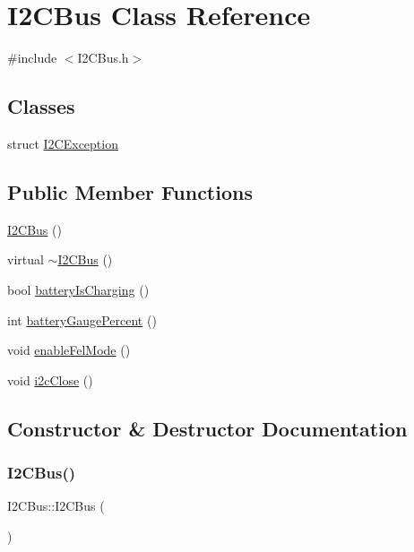 \hypertarget{classI2CBus}{}\section{I2\+C\+Bus Class Reference}
\label{classI2CBus}


{\ttfamily \#include $<$I2\+C\+Bus.\+h$>$}

\subsection*{Classes}
\begin{DoxyCompactItemize}
\item 
struct \mbox{\hyperlink{structI2CBus_1_1I2CException}{I2\+C\+Exception}}
\end{DoxyCompactItemize}
\subsection*{Public Member Functions}
\begin{DoxyCompactItemize}
\item 
\mbox{\hyperlink{classI2CBus_ac6ff4433440a77e9978080e848917930}{I2\+C\+Bus}} ()
\item 
virtual \mbox{\hyperlink{classI2CBus_a70dac2923cd16ce06f0e73f7fc5bca89}{$\sim$\+I2\+C\+Bus}} ()
\item 
bool \mbox{\hyperlink{classI2CBus_a54c84733e096f9f08338c18072a02f71}{battery\+Is\+Charging}} ()
\item 
int \mbox{\hyperlink{classI2CBus_a41d93fe98984595078aea7b54f475fbe}{battery\+Gauge\+Percent}} ()
\item 
void \mbox{\hyperlink{classI2CBus_ac92bf5730bad62c9118e47eac2f8f69a}{enable\+Fel\+Mode}} ()
\item 
void \mbox{\hyperlink{classI2CBus_a963f9df4208f99c796cede0552ca83ba}{i2c\+Close}} ()
\end{DoxyCompactItemize}


\subsection{Constructor \& Destructor Documentation}
\mbox{\label{classI2CBus_ac6ff4433440a77e9978080e848917930}} 
\subsubsection{\texorpdfstring{I2\+C\+Bus()}{I2CBus()}}
{\footnotesize\ttfamily I2\+C\+Bus\+::\+I2\+C\+Bus (\begin{DoxyParamCaption}{ }\end{DoxyParamCaption})\hspace{0.3cm}{\ttfamily [inline]}}

